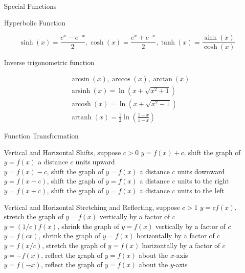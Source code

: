 \documentclass{beamer}
\begin{document}
\begin{frame}{Special Functions}
    \begin{block}{Hyperbolic Function}

$$
\sinh (x)=\frac{e^{x}-e^{-x}}{2}, \cosh (x)=\frac{e^{x}+e^{-x}}{2}, \tanh (x)=\frac{\sinh (x)}{\cosh (x)}
$$
    \end{block}
    \begin{block}{Inverse trigonometric function}

$$
\begin{aligned}
&\arcsin (x), \arccos (x), \arctan (x) \\
&\operatorname{arsinh}(x)=\ln \left(x+\sqrt{x^{2}+1}\right)\\ &\operatorname{arcosh}(x)=\ln \left(x+\sqrt{x^{2}-1}\right)\\ &\operatorname{artanh}(x)=\frac{1}{2} \ln \left(\frac{1+x}{1-x}\right)
\end{aligned}
$$
    \end{block}
\end{frame}
\begin{frame}{Function Transformation}
    \begin{block}{Vertical and Horizontal Shifts, suppose $c>0$}
    $y=f(x)+c$, shift the graph of $y=f(x)$ a distance $c$ units upward\\ $y=f(x)-c$, shift the graph of $y=f(x)$ a distance $c$ units downward\\ $y=f(x-c)$, shift the graph of $y=f(x)$ a distance $c$ units to the right\\ $y=f(x+c)$, shift the graph of $y=f(x)$ a distance $c$ units to the left\\
    \end{block}
    \begin{block}{Vertical and Horizontal Stretching and Reflecting, suppose $c>1$}
    $y=c f(x)$, stretch the graph of $y=f(x)$ vertically by a factor of $c$\\ $y=(1 / c) f(x)$, shrink the graph of $y=f(x)$ vertically by a factor of $c$\\
    $y=f(c x)$, shrink the graph of $y=f(x)$ horizontally by a factor of $c$\\ $y=f(x / c)$, stretch the graph of $y=f(x)$ horizontally by a factor of $c$\\
    $y=-f(x)$, reflect the graph of $y=f(x)$ about the $x$-axis\\ $y=f(-x)$, reflect the graph of $y=f(x)$ about the $y$-axis
    \end{block}
\end{frame}
\end{document}
